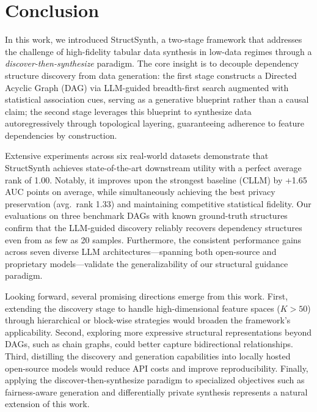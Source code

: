 \section{Conclusion}

In this work, we introduced \textsf{StructSynth}, a two-stage framework that addresses the challenge of high-fidelity tabular data synthesis in low-data regimes through a \emph{discover-then-synthesize} paradigm. The core insight is to decouple dependency structure discovery from data generation: the first stage constructs a Directed Acyclic Graph (DAG) via LLM-guided breadth-first search augmented with statistical association cues, serving as a generative blueprint rather than a causal claim; the second stage leverages this blueprint to synthesize data autoregressively through topological layering, guaranteeing adherence to feature dependencies by construction.

Extensive experiments across six real-world datasets demonstrate that \textsf{StructSynth} achieves state-of-the-art downstream utility with a perfect average rank of 1.00. Notably, it improves upon the strongest baseline (CLLM) by +1.65 AUC points on average, while simultaneously achieving the best privacy preservation (avg.\ rank 1.33) and maintaining competitive statistical fidelity. Our evaluations on three benchmark DAGs with known ground-truth structures confirm that the LLM-guided discovery reliably recovers dependency structures even from as few as 20 samples. Furthermore, the consistent performance gains across seven diverse LLM architectures---spanning both open-source and proprietary models---validate the generalizability of our structural guidance paradigm.

Looking forward, several promising directions emerge from this work. First, extending the discovery stage to handle high-dimensional feature spaces ($K > 50$) through hierarchical or block-wise strategies would broaden the framework's applicability. Second, exploring more expressive structural representations beyond DAGs, such as chain graphs, could better capture bidirectional relationships. Third, distilling the discovery and generation capabilities into locally hosted open-source models would reduce API costs and improve reproducibility. Finally, applying the discover-then-synthesize paradigm to specialized objectives such as fairness-aware generation and differentially private synthesis represents a natural extension of this work.

